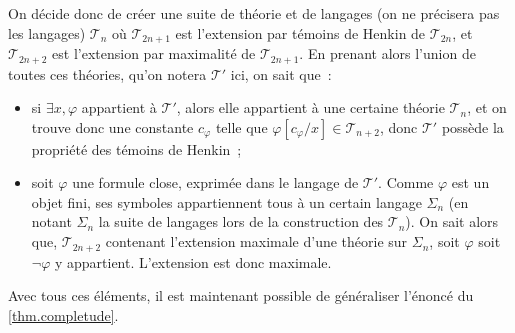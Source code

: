 On décide donc de créer une suite de théorie et de langages (on ne précisera pas
les langages) $\mathcal T_n$ où $\mathcal T_{2n+1}$ est l'extension par témoins
de Henkin de $\mathcal T_{2n}$, et $\mathcal T_{2n+2}$ est l'extension par
maximalité de $\mathcal T_{2n+1}$. En prenant alors l'union de toutes ces
théories, qu'on notera $\mathcal T'$ ici, on sait que~:
\begin{itemize}
\item si $\exists x, \varphi$ appartient à $\mathcal T'$, alors elle appartient
  à une certaine théorie $\mathcal T_n$, et on trouve donc une constante
  $c_{\varphi}$ telle que $\varphi[c_{\varphi}/x] \in \mathcal T_{n+2}$, donc
  $\mathcal T'$ possède la propriété des témoins de Henkin~;
\item soit $\varphi$ une formule close, exprimée dans le langage de
  $\mathcal T'$. Comme $\varphi$ est un objet fini, ses symboles appartiennent
  tous à un certain langage $\Sigma_n$ (en notant $\Sigma_n$ la suite de
  langages lors de la construction des $\mathcal T_n$). On sait alors que,
  $\mathcal T_{2n+2}$ contenant l'extension maximale d'une théorie sur
  $\Sigma_n$, soit $\varphi$ soit $\lnot\varphi$ y appartient. L'extension est
  donc maximale.
\end{itemize}

Avec tous ces éléments, il est maintenant possible de généraliser l'énoncé du
\cref{thm.completude}.

